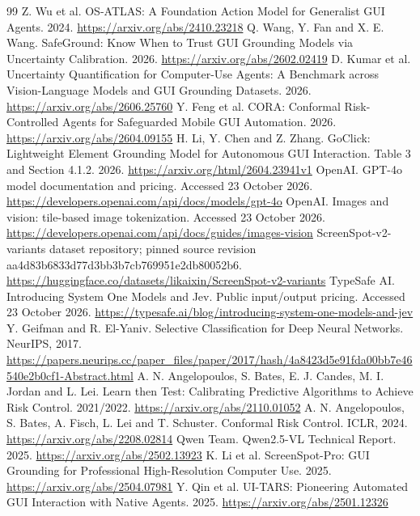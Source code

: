 \documentclass[10pt]{article}
\begin{document}
\begin{thebibliography}{99}
 Z. Wu et al. OS-ATLAS: A Foundation Action Model for Generalist GUI Agents. 2024. \url{https://arxiv.org/abs/2410.23218}
 Q. Wang, Y. Fan and X. E. Wang. SafeGround: Know When to Trust GUI Grounding Models via Uncertainty Calibration. 2026. \url{https://arxiv.org/abs/2602.02419}
 D. Kumar et al. Uncertainty Quantification for Computer-Use Agents: A Benchmark across Vision-Language Models and GUI Grounding Datasets. 2026. \url{https://arxiv.org/abs/2606.25760}
 Y. Feng et al. CORA: Conformal Risk-Controlled Agents for Safeguarded Mobile GUI Automation. 2026. \url{https://arxiv.org/abs/2604.09155}
 H. Li, Y. Chen and Z. Zhang. GoClick: Lightweight Element Grounding Model for Autonomous GUI Interaction. Table 3 and Section 4.1.2. 2026. \url{https://arxiv.org/html/2604.23941v1}
 OpenAI. GPT-4o model documentation and pricing. Accessed 23 October 2026. \url{https://developers.openai.com/api/docs/models/gpt-4o}
 OpenAI. Images and vision: tile-based image tokenization. Accessed 23 October 2026. \url{https://developers.openai.com/api/docs/guides/images-vision}
 ScreenSpot-v2-variants dataset repository; pinned source revision aa4d83b6833d77d3bb3b7cb769951e2db80052b6. \url{https://huggingface.co/datasets/likaixin/ScreenSpot-v2-variants}
 TypeSafe AI. Introducing System One Models and Jev. Public input/output pricing. Accessed 23 October 2026. \url{https://typesafe.ai/blog/introducing-system-one-models-and-jev}
 Y. Geifman and R. El-Yaniv. Selective Classification for Deep Neural Networks. NeurIPS, 2017. \url{https://papers.neurips.cc/paper_files/paper/2017/hash/4a8423d5e91fda00bb7e46540e2b0cf1-Abstract.html}
 A. N. Angelopoulos, S. Bates, E. J. Candes, M. I. Jordan and L. Lei. Learn then Test: Calibrating Predictive Algorithms to Achieve Risk Control. 2021/2022. \url{https://arxiv.org/abs/2110.01052}
 A. N. Angelopoulos, S. Bates, A. Fisch, L. Lei and T. Schuster. Conformal Risk Control. ICLR, 2024. \url{https://arxiv.org/abs/2208.02814}
 Qwen Team. Qwen2.5-VL Technical Report. 2025. \url{https://arxiv.org/abs/2502.13923}
 K. Li et al. ScreenSpot-Pro: GUI Grounding for Professional High-Resolution Computer Use. 2025. \url{https://arxiv.org/abs/2504.07981}
 Y. Qin et al. UI-TARS: Pioneering Automated GUI Interaction with Native Agents. 2025. \url{https://arxiv.org/abs/2501.12326}
\end{thebibliography}
\clearpage
\appendix
\end{document}
